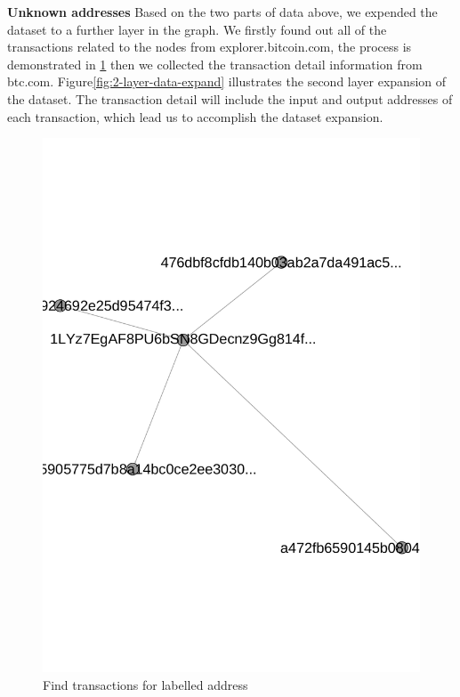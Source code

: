 \textbf{Unknown addresses}
Based on the two parts of data above, we expended the dataset to a further layer in the graph. We firstly found out all of the transactions related to the nodes from explorer.bitcoin.com\cite{explorer.bitcoin.com}, the process is demonstrated in \ref{fig:1-layer-data-expand} then we collected the transaction detail information from btc.com\cite{btc.com}. Figure\ref{fig:2-layer-data-expand} illustrates the second layer expansion of the dataset. The transaction detail will include the input and output addresses of each transaction, which lead us to accomplish the dataset expansion.
\begin{figure}[tbp]
\centerline{\includegraphics[width=0.6\columnwidth]{images/1-layer-data-expand.pdf}}
\caption{Find transactions for labelled address}
\label{fig:1-layer-data-expand}
\end{figure}
